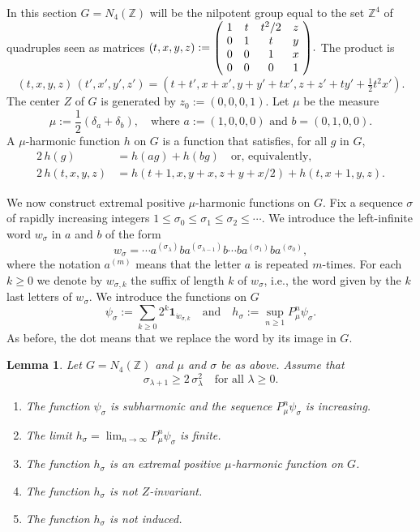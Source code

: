 \documentclass[11pt]{article}
\newcommand{\ie}{i.e.,\xspace}
\numberwithin{equation}{section}
\newenvironment{enumeratea}
{\bgroup\def\theenumi{\alph{enumi}}\begin{enumerate}}
{\end{enumerate}\egroup}
\newtheorem{Lem}[Thm]{Lemma}
\theoremstyle{definition}
\newcommand{\m}[1]{\mathbb{ #1}}
\let\de\delta
\let\la\lambda
\let\si\sigma
\begin{document}
In this section $G=N_4(\m Z)$ will be the nilpotent group equal to the set $\m Z^4$
of quadruples seen as matrices
$(t,x,y,z):=\mbox{\scriptsize $\left(\!
\begin{array}{cccc} 1 &t&t^2/2&z \\
0 &1&t&y\\0&0&1&x\\0&0&0&1
\end{array}\!\right)$}.$ The product is
\begin{equation*}
\label{eqnprofour}
(t,x,y,z)\, (t',x',y',z')= (t+t',x+x',y+y'+tx',z+z'+ty'+\tfrac12 t^2x').
\end{equation*}
The center $Z$ of $G$ is generated by $z_0:=(0,0,0,1)$.
Let $\mu$ be the measure
\begin{equation*}
\label{eqnmu0}
\mu:=\frac12(\de_{a}+\de_{b}),
\quad\text{where $a:=(1,0,0,0)$ and $b=(0,1,0,0)$.}
\end{equation*}
A $\mu$-harmonic function $h$ on $G$ is a function that satisfies, for all $g$ in $G$,
\begin{align*}
\label{eqnhghaghbg}
2\,h(g)&= h(ag)+ h(bg)
\quad\text{or, equivalently,}\\
2\,h(t,x,y,z)&= h(t\!+\!1,x,y+x,z\!+\!y\!+\! x/2)+ h(t,x\!+\!1,y,z).
\end{align*}

We now construct
extremal positive $\mu$-harmonic functions on $G$. Fix a sequence $\si$ of rapidly increasing integers $1\leq \si_0\leq \si_1\leq \si_2\leq\cdots$.
We introduce the left-infinite word $w_\si$ in $a$ and $b$ of the form
\[
w_\si = \cdots a^{(\si_{\la})}ba^{(\si_{\la-1})}b\cdots ba^{(\si_1)}ba^{(\si_0)},
\]
where the notation $a^{(m)}$ means that the letter $a$ is repeated $m$-times.
For each $k\geq 0$ we denote by $w_{\si,k}$ the suffix of length $k$ of $w_\si$,
\ie the word given by the $k$ last letters of $w_\si$.
We introduce the functions on $G$
\[
\psi_\si:=\sum_{k\geq 0}2^k\mathbf{1}_{\dot{w}_{\si,k}}
\quad\text{and}\quad
h_\si:=\sup_{n\geq 1}P_\mu^n\psi_\si.
\]
As before, the dot means that we replace the word by its image in $G$.

\begin{Lem}
\label{lemnilpfour}
Let $G=N_4(\m Z)$ and $\mu$ and $\si$ be as above. Assume that
\begin{equation}
\label{eqnsilaincrease}
\si_{\la+1}\geq 2\, \si_{\la}^2
\quad\text{for all $\la\geq 0$}.
\end{equation}
\begin{enumeratea}
\item\label{lemnilpfoura}
The function $\psi_\si$ is subharmonic and the sequence $P_\mu^n\psi_\si$ is increasing.
\item\label{lemnilpfourb}
The limit $h_\si=\lim_{n\to \infty}P_\mu^n\psi_\si$ is finite.
\item\label{lemnilpfourc}
The function $h_\si$ is an extremal positive $\mu$-harmonic function on $G$.
\item\label{lemnilpfourd}
The function $h_\si$ is not $Z$-invariant.
\item\label{lemnilpfoure}
The function $h_\si$ is not induced.
\end{enumeratea}
\end{Lem}
\end{document}
